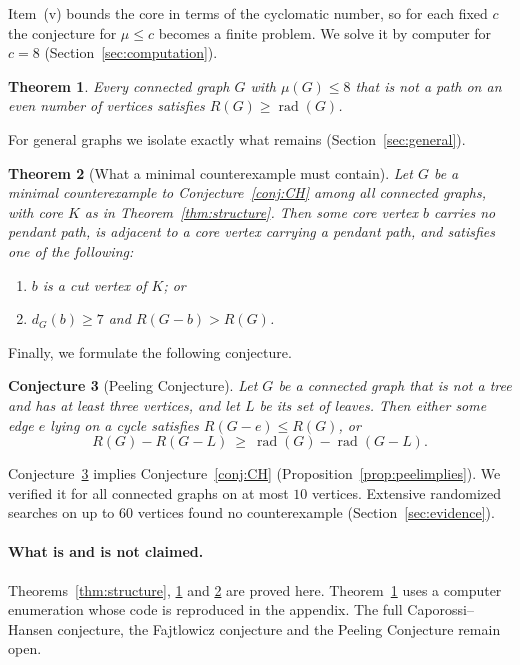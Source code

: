 \documentclass[11pt,a4paper]{article}
\newtheorem{theorem}{Theorem}[section]
\newtheorem{conjecture}[theorem]{Conjecture}
\theoremstyle{definition}
\newcommand{\rad}{\operatorname{rad}}
\begin{document}
Item~(v) bounds the core in terms of the cyclomatic number, so for each fixed $c$ the conjecture for $\mu\le c$ becomes a finite problem. We solve it by computer for $c=8$ (Section~\ref{sec:computation}).

\begin{theorem}\label{thm:mu7}
Every connected graph $G$ with $\mu(G)\le8$ that is not a path on an even number of vertices satisfies $R(G)\ge\rad(G)$.
\end{theorem}

For general graphs we isolate exactly what remains (Section~\ref{sec:general}).

\begin{theorem}[What a minimal counterexample must contain]\label{thm:general}
Let $G$ be a minimal counterexample to Conjecture~\ref{conj:CH} among all connected graphs, with core $K$ as in Theorem~\ref{thm:structure}. Then some core vertex $b$ carries no pendant path, is adjacent to a core vertex carrying a pendant path, and satisfies one of the following:
\begin{enumerate}[label=\textup{(\alph*)}]
\item $b$ is a cut vertex of $K$; or
\item $d_G(b)\ge7$ and $R(G-b)>R(G)$.
\end{enumerate}
\end{theorem}

Finally, we formulate the following conjecture.

\begin{conjecture}[Peeling Conjecture]\label{conj:peel}
Let $G$ be a connected graph that is not a tree and has at least three vertices, and let $L$ be its set of leaves. Then either some edge $e$ lying on a cycle satisfies $R(G-e)\le R(G)$, or
\[
R(G)-R(G-L)\ \ge\ \rad(G)-\rad(G-L).
\]
\end{conjecture}

Conjecture~\ref{conj:peel} implies Conjecture~\ref{conj:CH} (Proposition~\ref{prop:peelimplies}). We verified it for all connected graphs on at most $10$ vertices. Extensive randomized searches on up to $60$ vertices found no counterexample (Section~\ref{sec:evidence}).

\paragraph{What is and is not claimed.}
Theorems~\ref{thm:structure}, \ref{thm:mu7} and \ref{thm:general} are proved here. Theorem~\ref{thm:mu7} uses a computer enumeration whose code is reproduced in the appendix. The full Caporossi--Hansen conjecture, the Fajtlowicz conjecture and the Peeling Conjecture remain open.
\end{document}
